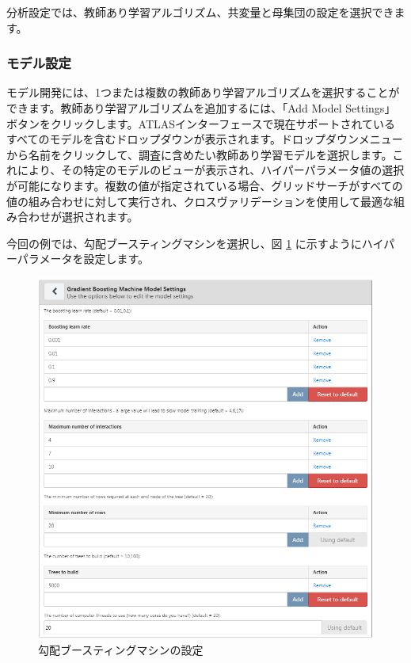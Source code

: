 \documentclass[
  11pt]{book}
\theoremstyle{definition}
\theoremstyle{definition}
\theoremstyle{definition}
\theoremstyle{definition}
\theoremstyle{remark}
\begin{document}
分析設定では、教師あり学習アルゴリズム、共変量と母集団の設定を選択できます。

\subsubsection*{モデル設定}\label{ux30e2ux30c7ux30ebux8a2dux5b9a}

モデル開発には、1つまたは複数の教師あり学習アルゴリズムを選択することができます。教師あり学習アルゴリズムを追加するには、「Add Model Settings」ボタンをクリックします。ATLASインターフェースで現在サポートされているすべてのモデルを含むドロップダウンが表示されます。ドロップダウンメニューから名前をクリックして、調査に含めたい教師あり学習モデルを選択します。これにより、その特定のモデルのビューが表示され、ハイパーパラメータ値の選択が可能になります。複数の値が指定されている場合、グリッドサーチがすべての値の組み合わせに対して実行され、クロスヴァリデーションを使用して最適な組み合わせが選択されます。

今回の例では、勾配ブースティングマシンを選択し、図 \ref{fig:gbmSettings} に示すようにハイパーパラメータを設定します。

\begin{figure}

{\centering \includegraphics[width=1\linewidth]{images/PatientLevelPrediction/gbmSettings} 

}

\caption{勾配ブースティングマシンの設定}\label{fig:gbmSettings}
\end{figure}
\end{document}
